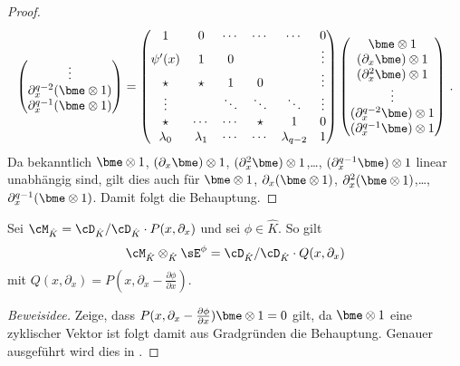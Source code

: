 \begin{proof}
\[\begin{pmatrix}
\vdots\\
\partial_x^{q-2}(\bme\otimes 1)\\
\partial_x^{q-1}(\bme\otimes 1)\\
\end{pmatrix}
=
\begin{pmatrix}
1         & 0         & \cdots & \cdots & \cdots        & 0 \\
\psi'(x)  & 1         & 0      &        &               & \vdots\\
\star     & \star     & 1      & 0      &               & \vdots\\
\vdots    &           & \ddots & \ddots & \ddots        & \vdots\\
\star     & \cdots    & \cdots & \star  & 1             & 0\\
\lambda_0 & \lambda_1 & \cdots & \cdots & \lambda_{q-2} & 1\\
\end{pmatrix}
\begin{pmatrix}
\bme\otimes 1\\
(\partial_x \bme)\otimes 1\\
(\partial_x^{2}\bme)\otimes 1\\
\vdots\\
(\partial_x^{q-2}\bme)\otimes 1\\
(\partial_x^{q-1}\bme)\otimes 1\\
\end{pmatrix}
\,.
\]
Da bekanntlich $\bme\otimes1$, $(\partial_x \bme)\otimes 1$,
$(\partial_x^{2}\bme)\otimes 1$,\dots, $(\partial_x^{q-1}\bme)\otimes 1$ linear
unabhängig sind, gilt dies auch für $\bme\otimes 1$, $\partial_x(\bme\otimes
1)$, $\partial_x^2(\bme\otimes 1)$,\dots, $\partial_x^{q-1}(\bme\otimes 1)$.
Damit folgt die Behauptung.
\end{proof}
\begin{lem} \label{lem:twistRechenregel}
Sei $\cM_{\hat K}=\cD_{\hat K}/\cD_{\hat K}\cdot P(x,\partial_x)$ und sei
$\phi\in \hat K$. So gilt
\[
\cM_{\hat K}\otimes_{\hat K}\sE^{\phi}=\cD_{\hat K}/\cD_{\hat K}\cdot
Q(x,\partial_x)
\]
mit $Q(x,\partial_x)=P(x,\partial_x-\frac{\partial \phi}{\partial x})$.
\end{lem}
\begin{proof}[Beweisidee]
Zeige, dass $P(x,\partial_x-\frac{\partial \phi}{\partial x})\bme\otimes1=0$
gilt, da $\bme\otimes1$ eine zyklischer Vektor ist folgt damit aus Gradgründen
die Behauptung. Genauer ausgeführt wird dies in \cite[Seiten 39 bis
44]{DiplHedwig}.
\begin{comment}
\begin{align*}
P(x,\partial_x-\frac{\partial \phi}{\partial x})\bme\otimes1
 &=TODO
\end{align*}
\end{comment}
\end{proof}
